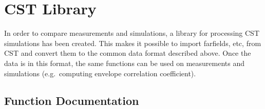 \section{CST Library}
In order to compare measurements and simulations, a library for processing CST simulations has been created. This makes it possible to import farfields, etc, from CST and convert them to the common data format described above. Once the data is in this format, the same functions can be used on measurements and simulations (e.g.\ computing envelope correlation coefficient).

\subsection{Function Documentation}

